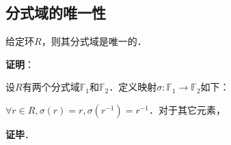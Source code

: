 \subsection{分式域的唯一性}

\begin{theorem}{}\label{FrcFld_the1}
给定环$R$，则其分式域是唯一的．
\end{theorem}

\textbf{证明}：

设$R$有两个分式域$\mathbb{F}_1$和$\mathbb{F}_2$．定义映射$\sigma:\mathbb{F}_1\to\mathbb{F}_2$如下：

$\forall r\in R, \sigma(r)=r, \sigma(r^{-1})=r^{-1}$．对于其它元素，

\textbf{证毕}．













